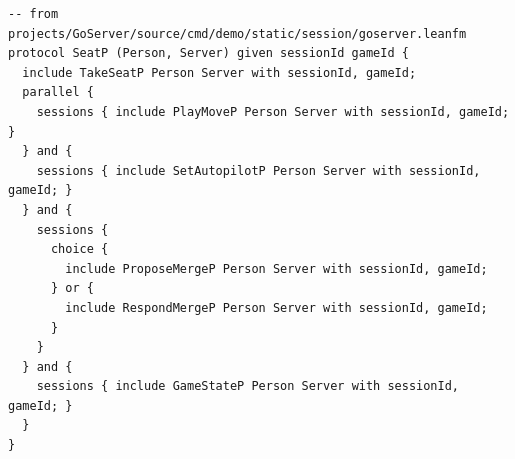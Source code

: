 \begin{lstlisting}[language={},basicstyle=\ttfamily\footnotesize,breaklines=true]
-- from projects/GoServer/source/cmd/demo/static/session/goserver.leanfm
protocol SeatP (Person, Server) given sessionId gameId {
  include TakeSeatP Person Server with sessionId, gameId;
  parallel {
    sessions { include PlayMoveP Person Server with sessionId, gameId; }
  } and {
    sessions { include SetAutopilotP Person Server with sessionId, gameId; }
  } and {
    sessions {
      choice {
        include ProposeMergeP Person Server with sessionId, gameId;
      } or {
        include RespondMergeP Person Server with sessionId, gameId;
      }
    }
  } and {
    sessions { include GameStateP Person Server with sessionId, gameId; }
  }
}
\end{lstlisting}
